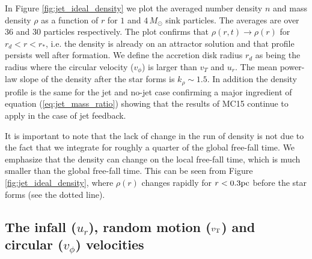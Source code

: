 \documentclass[../dissertation.tex]{subfiles}
\begin{document}
In Figure \ref{fig:jet_ideal_density} we plot the averaged number density $n$ and mass density $\rho$ as a function of $r$ for $1$ and $4 \, M_\odot$ sink particles.
The averages are over 36 and 30 particles respectively.
The plot confirms that $\rho(r,t) \rightarrow \rho(r)$ for $r_d < r < r_*$, i.e. the density is already on an attractor solution and that profile persists well after formation.
We define the accretion disk radius $r_d$ as being the radius where the circular velocity ($v_\phi$) is larger than $v_T$ and $u_r$.
The mean power-law slope of the density after the star forms is $k_\rho \sim 1.5$. In addition the density profile is the same for the jet and no-jet case confirming a major ingredient of equation (\ref{eq:jet_mass_ratio}) showing that the results of MC15 continue to apply in the case of jet feedback.

It is important to note that the lack of change in the run of density is not due to the fact that we integrate for roughly a quarter of the global free-fall time.
We emphasize that the density can change on the local free-fall time, which is much smaller than the global free-fall time.
This can be seen from Figure \ref{fig:jet_ideal_density}, where $\rho(r)$ changes rapidly for $r < 0.3 {\rm pc}$ before the star forms (see the dotted line).

\subsection{The infall ($u_r$), random motion ($v_{\rm T}$)  and circular ($v_{\phi}$) velocities} \label{sec:jet_small_scale}
\end{document}
